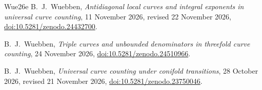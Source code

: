 \begin{thebibliography}{Wue26e}
 B.~J.~Wuebben,
\emph{Antidiagonal local curves and integral exponents in universal curve counting}, 11 November 2026, revised 22 November 2026,
\href{https://doi.org/10.5281/zenodo.24432700}{doi:10.5281/zenodo.24432700}.

 B.~J.~Wuebben,
\emph{Triple curves and unbounded denominators in threefold curve counting}, 24 November 2026,
\href{https://doi.org/10.5281/zenodo.24510966}{doi:10.5281/zenodo.24510966}.

 B.~J.~Wuebben,
\emph{Universal curve counting under conifold transitions}, 28 October 2026, revised 21 November 2026,
\href{https://doi.org/10.5281/zenodo.23750046}{doi:10.5281/zenodo.23750046}.

\end{thebibliography}
